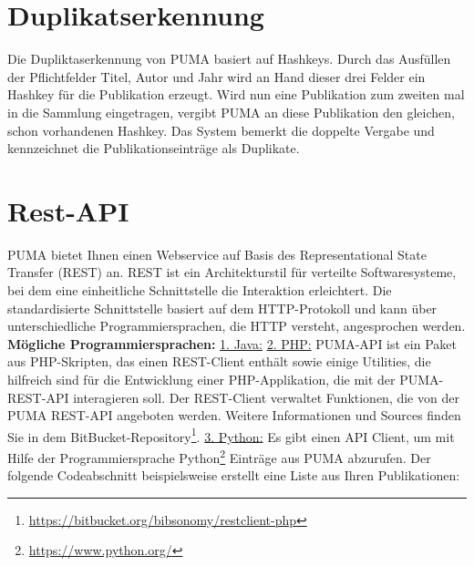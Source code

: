 \section{Duplikatserkennung} 
\label{sec:duplikat}
Die Dupliktaserkennung von PUMA basiert auf Hashkeys. Durch das Ausfüllen der Pflichtfelder Titel, Autor und Jahr wird an Hand dieser drei Felder ein Hashkey für die Publikation erzeugt. Wird nun eine Publikation zum zweiten mal in die Sammlung eingetragen, vergibt PUMA an diese Publikation den gleichen, schon vorhandenen Hashkey. Das System bemerkt die doppelte Vergabe und kennzeichnet die Publikationseinträge als Duplikate. 


\section{Rest-API}
\label{sec:restApi}
PUMA bietet Ihnen einen Webservice auf Basis des Representational State Transfer (REST) an. \newline
REST ist ein Architekturstil für verteilte Softwaresysteme, bei dem eine einheitliche Schnittstelle die Interaktion erleichtert. Die standardisierte Schnittstelle basiert auf dem HTTP-Protokoll und kann über unterschiedliche Programmiersprachen, die HTTP versteht, angesprochen werden.\newline\newline
\textbf{Mögliche Programmiersprachen:}\newline\newline
\underline{1. Java:}   \newline\newline 
\underline{2. PHP:}\newline
PUMA-API ist ein Paket aus PHP-Skripten, das einen REST-Client enthält sowie einige Utilities, die hilfreich sind für die Entwicklung einer PHP-Applikation, die mit der PUMA-REST-API interagieren soll. Der REST-Client verwaltet Funktionen, die von der PUMA REST-API angeboten werden.
\newline
Weitere Informationen und Sources finden Sie in dem BitBucket-Repository\footnote{\url{https://bitbucket.org/bibsonomy/restclient-php}}.  
\newline\newline
\underline{3. Python:}\newline
Es gibt einen API Client, um mit Hilfe der Programmiersprache Python\footnote{\url{https://www.python.org/}} Einträge aus PUMA abzurufen. Der folgende Codeabschnitt beispielsweise erstellt eine Liste aus Ihren Publikationen:\newline\newline
